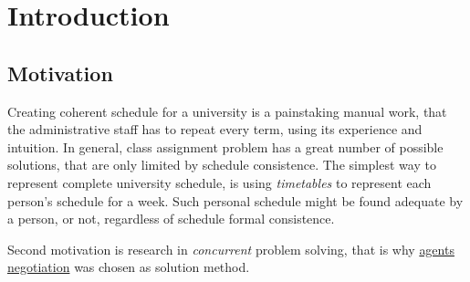 \documentclass[header]{subfiles}
\begin{document}
\chapter{Introduction}

%
%
%
%

\section{Motivation}
Creating coherent schedule for a university is a painstaking manual work, that
the administrative staff has to repeat every term, using its experience and
intuition. In general, class assignment problem has a great number of possible
solutions, that are only limited by schedule consistence. The simplest way to
represent complete university schedule, is using \emph{timetables} to represent
each person's schedule for a week. Such personal schedule might be found adequate
by a person, or not, regardless of schedule formal consistence.

Second motivation is research in \emph{concurrent} problem solving, that is
why \underline{agents negotiation} was chosen as solution method.

\end{document}

